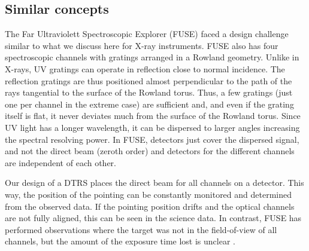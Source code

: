 \documentclass[linenumbers]{aastex631}
\begin{document}
\subsection{Similar concepts}

The Far Ultraviolett Spectroscopic Explorer (FUSE) \citep{2000ApJ...538L...1M} faced a design challenge similar to what we discuss here for X-ray instruments. FUSE also has four spectroscopic channels with gratings arranged in a Rowland geometry. Unlike in X-rays, UV gratings can operate in reflection close to normal incidence. The reflection gratings are thus positioned almost perpendicular to the path of the rays tangential to the surface of the Rowland torus. Thus, a few gratings (just one per channel in the extreme case) are sufficient and, and even if the grating itself is flat, it never deviates much from the surface of the Rowland torus. Since UV light has a longer wavelength, it can be dispersed to larger angles increasing the spectral resolving power. In FUSE, detectors just cover the dispersed signal, and not the direct beam (zeroth order) and detectors for the different channels are independent of each other.

Our design of a DTRS places the direct beam for all channels on a detector. This way, the position of the pointing can be constantly monitored and determined from the observed data. If the pointing position drifts and the optical channels are not fully aligned, this can be seen in the science data. In contrast, FUSE has performed observations where the target was not in the field-of-view of all channels, but the amount of the exposure time lost is unclear \citep{2000ApJ...538L...1M}.
\end{document}
